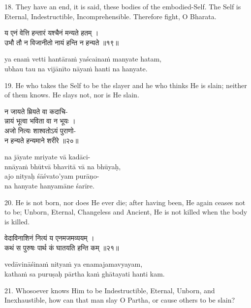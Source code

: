 18. They have an end, it is said, these bodies of the embodied-Self. The Self
is Eternal, Indestructible, Incomprehensible. Therefore fight, O Bharata.

\begin{gitaverse}
य एनं वेत्ति हन्तारं यश्चैनं मन्यते हतम् । \\
उभौ तौ न विजानीतो नायं हन्ति न हन्यते ॥१९॥
\end{gitaverse}

\begin{transliteration}
ya enaṁ vetti hantāraṁ yaścainaṁ manyate hatam, \\
ubhau tau na vijānīto nāyaṁ hanti na hanyate.
\end{transliteration}

19. He who takes the Self to be the slayer and he who thinks He is slain;
neither of them knows. He slays not, nor is He slain.

\begin{gitaverse}
न जायते म्रियते वा कदाचि- \\
\tab न्नायं भूत्वा भविता वा न भूयः । \\
अजो नित्यः शाश्वतोऽयं पुराणो- \\
\tab न हन्यते हन्यमाने शरीरे ॥२०॥
\end{gitaverse}

\begin{transliteration}
na jāyate mriyate vā kadāci- \\
\tab nnāyaṁ bhūtvā bhavitā vā na bhūyaḥ, \\
ajo nityaḥ śāśvato'yam purāṇo- \\
\tab na hanyate hanyamāne śarīre.
\end{transliteration}

20. He is not born, nor does He ever die; after having been, He again ceases
not to be; Unborn, Eternal, Changeless and Ancient, He is not killed when the
body is killed.

\begin{gitaverse}
वेदाविनाशिनं नित्यं य एनमजमव्ययम् । \\
कथं स पुरुषः पार्थ कं घातयति हन्ति कम् ॥२१॥
\end{gitaverse}

\begin{transliteration}
vedāvināśinaṁ nityaṁ ya enamajamavyayam, \\
kathaṁ sa puruṣaḥ pārtha kaṁ ghātayati hanti kam.
\end{transliteration}

21. Whosoever knows Him to be Indestructible, Eternal, Unborn, and
Inexhaustible, how can that man slay O Partha, or cause others to be slain?

